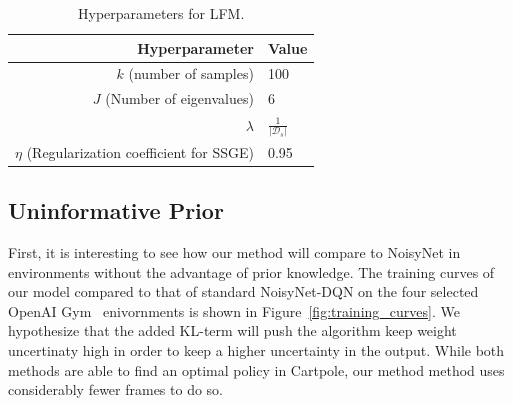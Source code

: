 \documentclass[]{uai2021} %
\begin{document}
\begin{table}
    \centering
    \caption{Hyperparameters for LFM.}\label{tab:hyperparams}
    \begin{tabular}{rl}
      \toprule %
      Hyperparameter & Value \\
      \midrule %
      \(k\) (number of samples) & 100\\
      \(J\) (Number of eigenvalues) & 6\\
      \(\lambda\) & \(\frac{1}{\lvert \mathcal{D}_s \rvert}\)\\
      \(\eta\) (Regularization coefficient for SSGE) & 0.95\\
      \bottomrule %
    \end{tabular}
\end{table}


\subsection{Uninformative Prior}
First, it is interesting to see how our method will compare to NoisyNet
in environments without the advantage of prior knowledge. The training curves
of our model compared to that of standard NoisyNet-DQN on the four selected OpenAI
Gym~\citep{brockman_openai_2016} enivornments is shown in Figure~\ref{fig:training_curves}.
We hypothesize that the added KL-term will push the algorithm keep weight uncertinaty high
in order to keep a higher uncertainty in the output. While both methods are able to
find an optimal policy in Cartpole, our method method uses considerably fewer frames
to do so.
\end{document}
